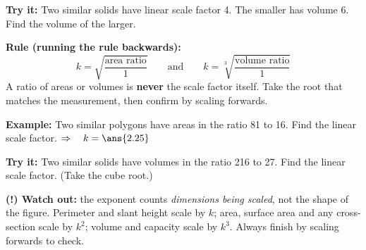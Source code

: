 \documentclass[12pt]{article}
\begin{document}
\begin{tryitbox}
\textbf{Try it:} \quad Two similar solids have linear scale factor 4. The smaller has
volume 6. Find the volume of the larger.\\[2pt]
\end{tryitbox}


\begin{formulabox}
\textbf{Rule (running the rule backwards):}
\[ k = \sqrt{\frac{\text{area ratio}}{1}} \qquad\text{and}\qquad
   k = \sqrt[3]{\frac{\text{volume ratio}}{1}} \]
A ratio of areas or volumes is \textbf{never} the scale factor itself. Take the root that
matches the measurement, then confirm by scaling forwards.
\end{formulabox}

\begin{examplebox}
\textbf{Example:} \quad Two similar polygons have areas in the ratio 81 to 16. Find the
linear scale factor.
$\Rightarrow\quad k = \ans{2.25}$
\end{examplebox}

\begin{tryitbox}
\textbf{Try it:} \quad Two similar solids have volumes in the ratio 216 to 27. Find the
linear scale factor. (Take the cube root.)\\[2pt]
\end{tryitbox}

\begin{watchoutbox}
\textbf{(!) Watch out:} the exponent counts \emph{dimensions being scaled}, not the shape
of the figure. Perimeter and slant height scale by $k$; area, surface area and any
cross-section scale by $k^2$; volume and capacity scale by $k^3$. Always finish by
scaling forwards to check.
\end{watchoutbox}
\end{document}
